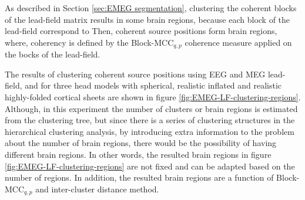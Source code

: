 As described in Section \ref{sec:EMEG segmentation}, clustering the coherent blocks of the lead-field matrix results in some brain regions, because each block of the lead-field correspond to 
Then, coherent source positions form brain regions, where, coherency is defined by the Block-MCC$_{q,p}$ coherence measure applied on the bocks of the lead-field.

The results of clustering coherent source positions using EEG and MEG lead-field, and for three head models with spherical, realistic inflated and realistic highly-folded cortical sheets are shown in figure \ref{fig:EMEG-LF-clustering-regions}. 
Although, in this experiment the number of clusters or brain regions is estimated from the clustering tree, but since there is a series of clustering structures in the hierarchical clustering analysis, by introducing extra information to the problem about the number of brain regions, there would be the possibility of having different brain regions.
In other words, the resulted brain regions in figure \ref{fig:EMEG-LF-clustering-regions} are not fixed and can be adapted based on the number of regions.
In addition, the resulted brain regions are a function of Block-MCC$_{q,p}$ and inter-cluster distance method.




\FloatBarrier